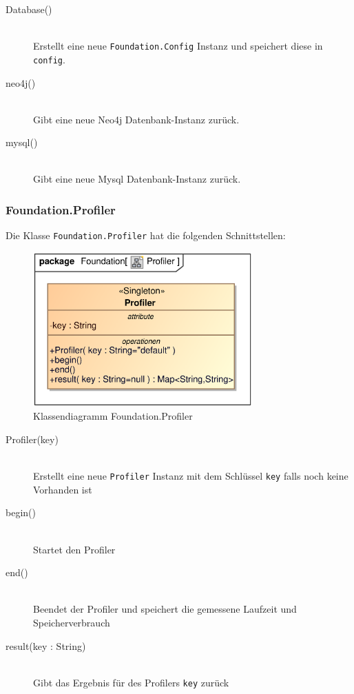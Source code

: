 \begin{description}
    \item[Database()] \hfill \\
    Erstellt eine neue \verb|Foundation.Config| Instanz und speichert diese in \verb|config|.
    
    \item[neo4j()] \hfill \\
    Gibt eine neue Neo4j Datenbank-Instanz zurück.
    
    \item[mysql()] \hfill \\
    Gibt eine neue Mysql Datenbank-Instanz zurück.
\end{description}

\subsubsection{Foundation.Profiler}
Die Klasse \verb|Foundation.Profiler| hat die folgenden Schnittstellen:

\begin{figure}[H]
    \myfloatalign
    \includegraphics[width=0.75\textwidth]{gfx/MtGDeepAnalysis/Profiler.eps}
    \caption{Klassendiagramm Foundation.Profiler}
    \label{fig:class:foundation.profiler}
\end{figure}

\begin{description}
    \item[Profiler(key)] \hfill \\
    Erstellt eine neue \verb|Profiler| Instanz mit dem Schlüssel \verb|key| falls noch keine Vorhanden ist
    
    \item[begin()] \hfill \\
    Startet den Profiler
    
    \item[end()] \hfill \\
    Beendet der Profiler und speichert die gemessene Laufzeit und Speicherverbrauch
    
    \item[result(key : String)] \hfill \\
    Gibt das Ergebnis für des Profilers \verb|key| zurück
\end{description}

